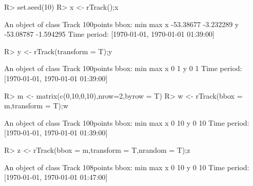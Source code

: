 \documentclass[article]{jss}
\begin{document}
\begin{Schunk}
\begin{Sinput}
R> set.seed(10)
R> x <- rTrack();x
\end{Sinput}
\begin{Soutput}
An object of class Track 
100points 
bbox: 
        min       max
x -53.38677 -3.232289
y -53.08787 -1.594295
Time period: [1970-01-01, 1970-01-01 01:39:00]
\end{Soutput}
\begin{Sinput}
R> y <- rTrack(transform = T);y
\end{Sinput}
\begin{Soutput}
An object of class Track 
100points 
bbox: 
  min max
x   0   1
y   0   1
Time period: [1970-01-01, 1970-01-01 01:39:00]
\end{Soutput}
\begin{Sinput}
R> m <- matrix(c(0,10,0,10),nrow=2,byrow = T)
R> w <- rTrack(bbox = m,transform = T);w
\end{Sinput}
\begin{Soutput}
An object of class Track 
100points 
bbox: 
  min max
x   0  10
y   0  10
Time period: [1970-01-01, 1970-01-01 01:39:00]
\end{Soutput}
\begin{Sinput}
R> z <- rTrack(bbox = m,transform = T,nrandom = T);z
\end{Sinput}
\begin{Soutput}
An object of class Track 
108points 
bbox: 
  min max
x   0  10
y   0  10
Time period: [1970-01-01, 1970-01-01 01:47:00]
\end{Soutput}
\end{Schunk}
\end{document}
